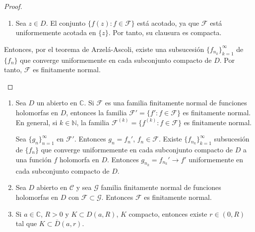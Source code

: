 \begin{proof}
\begin{itemize}
\begin{enumerate}
                \item Sea $z \in D$.
                      El conjunto $\{f(z) : f \in \mathcal{F}\}$ está acotado, ya que $\mathcal{F}$ está uniformemente acotada en $\{z\}$.
                      Por tanto, su clausura es compacta.
            \end{enumerate}

            Entonces, por el teorema de Arzelá-Ascoli, existe una subsucesión $\{f_{n_k}\}_{k=1}^\infty$ de $\{f_n\}$ que converge uniformemente en cada subconjunto compacto de $D$.
            Por tanto, $\mathcal{F}$ es finitamente normal.
    \end{itemize}
\end{proof}

\begin{remark}
    \hfill
    \begin{enumerate}
        \item Sea $D$ un abierto en $\mathbb{C}$.
              Si $\mathcal{F}$ es una familia finitamente normal de funciones holomorfas en $D$, entonces la familia $\mathcal{F}' = \{f' : f \in \mathcal{F}\}$ es finitamente normal.
              En general, si $k \in \mathbb{N}$, la familia $\mathcal{F}^{(k)} = \{f^{(k)} : f \in \mathcal{F}\}$ es finitamente normal.

              Sea $\{g_n\}_{n=1}^\infty$ en $\mathcal{F}'$.
              Entonces $g_n = f_n'$, $f_n \in \mathcal{F}$.
              Existe $\{f_{n_k}\}_{k=1}^\infty$ subsucesión de $\{f_n\}$ que converge uniformemente en cada subconjunto compacto de $D$ a una función $f$ holomorfa en $D$.
              Entonces $g_{n_k} = f_{n_k}' \to f'$ uniformemente en cada subconjunto compacto de $D$.

        \item Sea $D$ abierto en $\mathcal{C}$ y sea $\mathcal{G}$ familia finitamente normal de funciones holomorfas en $D$ con $\mathcal{F} \subset \mathcal{G}$.
              Entonces $\mathcal{F}$ es finitamente normal.

        \item Si $a \in \mathbb{C}$, $R > 0$ y $K \subset D(a, R)$, $K$ compacto, entonces existe $r \in (0, R)$ tal que $K \subset \overline{D}(a, r)$.
    \end{enumerate}
\end{remark}

